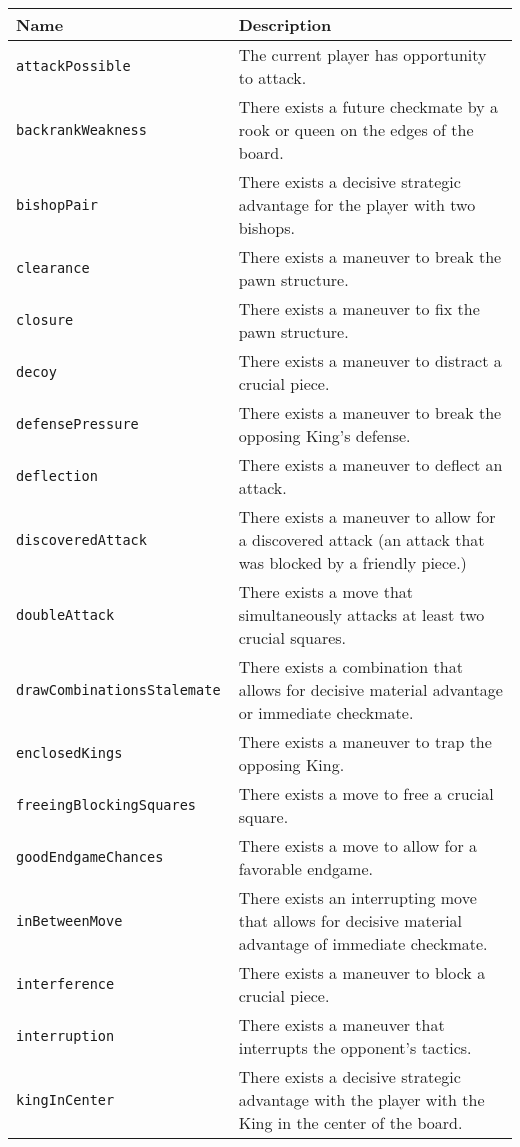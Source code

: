 \documentclass[11pt]{article}
\begin{document}
\begin{table*}
\centering
\begin{tabular}{lp{}}
\hline
\textbf{Name} & \textbf{Description} \\ \hline
\tt{attackPossible} & The current player has opportunity to attack. \\
\tt{backrankWeakness} & There exists a future checkmate by a rook or queen on the edges of the board. \\
\tt{bishopPair} & There exists a decisive strategic advantage for the player with two bishops. \\
\tt{clearance} & There exists a maneuver to break the pawn structure. \\ 
\tt{closure} & There exists a maneuver to fix the pawn structure. \\
\tt{decoy} & There exists a maneuver to distract a crucial piece. \\
\tt{defensePressure} & There exists a maneuver to break the opposing King’s defense. \\
\tt{deflection} & There exists a maneuver to deflect an attack.  \\ 
\tt{discoveredAttack} & There exists a maneuver to allow for a discovered attack (an attack that was blocked by a friendly piece.) \\
\tt{doubleAttack} & There exists a move that simultaneously attacks at least two crucial squares. \\
\tt{drawCombinationsStalemate} & There exists a combination that allows for decisive material advantage or immediate checkmate. \\
\tt{enclosedKings} & There exists a maneuver to trap the opposing King. \\
\tt{freeingBlockingSquares} & There exists a move to free a crucial square. \\
\tt{goodEndgameChances} & There exists a move to allow for a favorable endgame. \\
\tt{inBetweenMove} & There exists an interrupting move that allows for decisive material advantage of immediate checkmate. \\ 
\tt{interference} & There exists a maneuver to block a crucial piece. \\ 
\tt{interruption} & There exists a maneuver that interrupts the opponent’s tactics. \\
\tt{kingInCenter} & There exists a decisive strategic advantage with the player with the King in the center of the board. \\

\end{tabular}
\end{table*}
\end{document}
